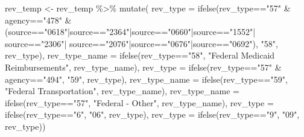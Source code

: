 \documentclass[
  letterpaper,
  DIV=11,
  numbers=noendperiod]{scrreport}
\newenvironment{Shaded}{\begin{snugshade}}{\end{snugshade}}
\newcommand{\AttributeTok}[1]{\textcolor[rgb]{0.40,0.45,0.13}{#1}}
\newcommand{\FunctionTok}[1]{\textcolor[rgb]{0.28,0.35,0.67}{#1}}
\newcommand{\NormalTok}[1]{\textcolor[rgb]{0.00,0.23,0.31}{#1}}
\newcommand{\OtherTok}[1]{\textcolor[rgb]{0.00,0.23,0.31}{#1}}
\newcommand{\SpecialCharTok}[1]{\textcolor[rgb]{0.37,0.37,0.37}{#1}}
\newcommand{\StringTok}[1]{\textcolor[rgb]{0.13,0.47,0.30}{#1}}
\begin{document}
\begin{Shaded}
\begin{Highlighting}[]
\NormalTok{rev\_temp }\OtherTok{\textless{}{-}}\NormalTok{ rev\_temp }\SpecialCharTok{\%\textgreater{}\%} 
  \FunctionTok{mutate}\NormalTok{(}
    \AttributeTok{rev\_type =} \FunctionTok{ifelse}\NormalTok{(rev\_type}\SpecialCharTok{==}\StringTok{"57"} \SpecialCharTok{\&}\NormalTok{ agency}\SpecialCharTok{==}\StringTok{"478"} \SpecialCharTok{\&}\NormalTok{ (source}\SpecialCharTok{==}\StringTok{"0618"}\SpecialCharTok{|}\NormalTok{source}\SpecialCharTok{==}\StringTok{"2364"}\SpecialCharTok{|}\NormalTok{source}\SpecialCharTok{==}\StringTok{"0660"}\SpecialCharTok{|}\NormalTok{source}\SpecialCharTok{==}\StringTok{"1552"}\SpecialCharTok{|}\NormalTok{ source}\SpecialCharTok{==}\StringTok{"2306"}\SpecialCharTok{|}\NormalTok{ source}\SpecialCharTok{==}\StringTok{"2076"}\SpecialCharTok{|}\NormalTok{source}\SpecialCharTok{==}\StringTok{"0676"}\SpecialCharTok{|}\NormalTok{source}\SpecialCharTok{==}\StringTok{"0692"}\NormalTok{), }\StringTok{"58"}\NormalTok{, rev\_type),}
    \AttributeTok{rev\_type\_name =} \FunctionTok{ifelse}\NormalTok{(rev\_type}\SpecialCharTok{==}\StringTok{"58"}\NormalTok{, }\StringTok{"Federal Medicaid Reimbursements"}\NormalTok{, rev\_type\_name),}
    \AttributeTok{rev\_type =} \FunctionTok{ifelse}\NormalTok{(rev\_type}\SpecialCharTok{==}\StringTok{"57"} \SpecialCharTok{\&}\NormalTok{ agency}\SpecialCharTok{==}\StringTok{"494"}\NormalTok{, }\StringTok{"59"}\NormalTok{, rev\_type),}
    \AttributeTok{rev\_type\_name =} \FunctionTok{ifelse}\NormalTok{(rev\_type}\SpecialCharTok{==}\StringTok{"59"}\NormalTok{, }\StringTok{"Federal Transportation"}\NormalTok{, rev\_type\_name),}
    \AttributeTok{rev\_type\_name =} \FunctionTok{ifelse}\NormalTok{(rev\_type}\SpecialCharTok{==}\StringTok{"57"}\NormalTok{, }\StringTok{"Federal {-} Other"}\NormalTok{, rev\_type\_name),}
    \AttributeTok{rev\_type =} \FunctionTok{ifelse}\NormalTok{(rev\_type}\SpecialCharTok{==}\StringTok{"6"}\NormalTok{, }\StringTok{"06"}\NormalTok{, rev\_type),}
    \AttributeTok{rev\_type =} \FunctionTok{ifelse}\NormalTok{(rev\_type}\SpecialCharTok{==}\StringTok{"9"}\NormalTok{, }\StringTok{"09"}\NormalTok{, rev\_type)) }


\end{Highlighting}
\end{Shaded}
\end{document}
